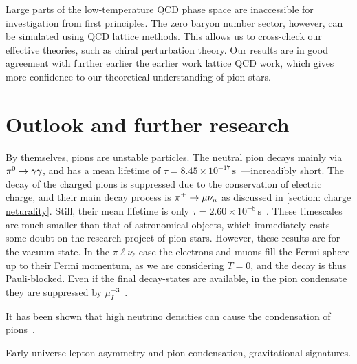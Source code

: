 Large parts of the low-temperature QCD phase space are inaccessible for investigation from first principles.
The zero baryon number sector, however, can be simulated using QCD lattice methods.
This allows us to cross-check our effective theories, such as chiral perturbation theory.
Our results are in good agreement with further earlier the earlier work lattice QCD work, which gives more confidence to our theoretical understanding of pion stars.


\section{Outlook and further research}

By themselves, pions are unstable particles.
The neutral pion decays mainly via ${\pi^0}\rightarrow \gamma\gamma$, and has a mean lifetime of $\tau = 8.45\times 10^{-17}\,\text{s}$~\autocite{particledatagroupReviewParticlePhysics2020}---increadibly short.
The decay of the charged pions is suppressed due to the conservation of electric charge, and their main decay process is ${\pi^\pm}\rightarrow \mu \nu_\mu$ as discussed in \autoref{section: charge neturality}.
Still, their mean lifetime is only $\tau = 2.60\times 10^{-8}\,\text{s}$~\autocite{particledatagroupReviewParticlePhysics2020}.
These timescales are much smaller than that of astronomical objects, which immediately casts some doubt on the research project of pion stars.
However, these results are for the vacuum state.
In the $\pi\ell\nu_\ell$-case the electrons and muons fill the Fermi-sphere up to their Fermi momentum, as we are considering $T = 0$, and the decay is thus Pauli-blocked.
Even if the final decay-states are available, in the pion condensate they are suppressed by $\mu_I^{-3}$~\autocite{brandtNewClassCompact2018}.



It has been shown that high neutrino densities can cause the condensation of pions~\autocite{abukiPionCondensationDense2009}.

Early universe lepton asymmetry and pion condensation, gravitational signatures\autocite{vovchenkoPionCondensationEarly2021,wygasCosmicQCDEpoch2018}.


